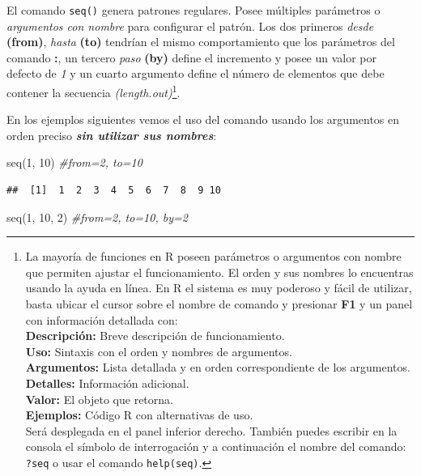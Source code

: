 \documentclass[
]{book}
\newenvironment{Shaded}{\begin{snugshade}}{\end{snugshade}}
\newcommand{\CommentTok}[1]{\textcolor[rgb]{0.56,0.35,0.01}{\textit{#1}}}
\newcommand{\DecValTok}[1]{\textcolor[rgb]{0.00,0.00,0.81}{#1}}
\newcommand{\FunctionTok}[1]{\textcolor[rgb]{0.00,0.00,0.00}{#1}}
\newcommand{\NormalTok}[1]{#1}
\begin{document}
El comando \texttt{seq()} genera patrones regulares. Posee múltiples parámetros o \emph{argumentos con nombre} para configurar el patrón. Los dos primeros \emph{desde} \textbf{(from)}, \emph{hasta} \textbf{(to)} tendrían el mismo comportamiento que los parámetros del comando \textbf{:}, un tercero \emph{paso} \textbf{(by)} define el incremento y posee un valor por defecto de \emph{1} y un cuarto argumento define el número de elementos que debe contener la secuencia \emph{(length.out)}\footnote{La mayoría de funciones en R poseen parámetros o argumentos con nombre que permiten ajustar el funcionamiento. El orden y sus nombres lo encuentras usando la ayuda en línea. En R el sistema es muy poderoso y fácil de utilizar, basta ubicar el cursor sobre el nombre de comando y presionar \textbf{F1} y un panel con información detallada con:\\
  \textbf{Descripción:} Breve descripción de funcionamiento.\\
  \textbf{Uso:} Sintaxis con el orden y nombres de argumentos.\\
  \textbf{Argumentos:} Lista detallada y en orden correspondiente de los argumentos.\\
  \textbf{Detalles:} Información adicional.\\
  \textbf{Valor:} El objeto que retorna.\\
  \textbf{Ejemplos:} Código R con alternativas de uso.\\
  Será desplegada en el panel inferior derecho. También puedes escribir en la consola el símbolo de interrogación y a continuación el nombre del comando: \texttt{?seq} o usar el comando \texttt{help(\textquotesingle{}seq\textquotesingle{})}.}.

En los ejemplos siguientes vemos el uso del comando usando los argumentos en orden preciso \textbf{\emph{sin utilizar sus nombres}}:

\begin{Shaded}
\begin{Highlighting}[]
\FunctionTok{seq}\NormalTok{(}\DecValTok{1}\NormalTok{, }\DecValTok{10}\NormalTok{) }\CommentTok{\#from=2, to=10}
\end{Highlighting}
\end{Shaded}

\begin{verbatim}
##  [1]  1  2  3  4  5  6  7  8  9 10
\end{verbatim}

\begin{Shaded}
\begin{Highlighting}[]
\FunctionTok{seq}\NormalTok{(}\DecValTok{1}\NormalTok{, }\DecValTok{10}\NormalTok{, }\DecValTok{2}\NormalTok{) }\CommentTok{\#from=2, to=10, by=2}
\end{Highlighting}
\end{Shaded}
\end{document}
